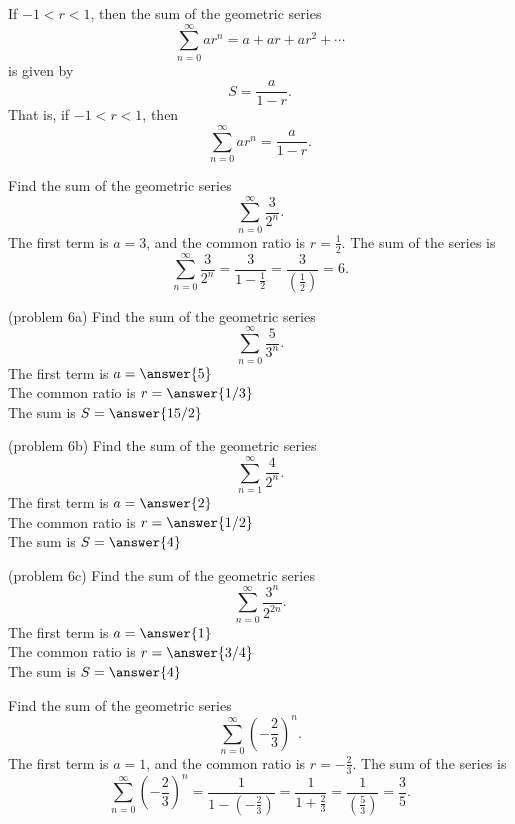 \documentclass{ximera}
\begin{document}
\begin{theorem}
If $-1 < r < 1$, then the sum of the geometric series 
\[
\sum_{n=0}^\infty ar^n = a + ar + ar^2 + \cdots
\] is given by 
\[
S = \frac{a}{1-r}.
\]
That is, if $-1 < r < 1$, then
\[
\sum_{n=0}^\infty ar^n = \frac{a}{1-r}.
\]
\end{theorem}

\begin{example}[example 6]
Find the sum of the geometric series 
\[
\sum_{n=0}^\infty \frac{3}{2^n}.
\]
The first term is $a = 3$, and the common ratio is $r = \frac12$. The sum of the series is
\[
\sum_{n=0}^\infty \frac{3}{2^n} = \frac{3}{1-\frac12} = \frac{3}{\left(\frac12\right)} = 6.
\]
\end{example}


\begin{problem}(problem 6a)
Find the sum of the geometric series 
\[
\sum_{n=0}^\infty \frac{5}{3^n}.
\]
The first term is $a = \answer{5}$\\
The common ratio is $r = \answer{1/3}$\\
The sum is $S= \answer{15/2}$

\end{problem}

\begin{problem}(problem 6b)
Find the sum of the geometric series 
\[
\sum_{n=1}^\infty \frac{4}{2^n}.
\]
The first term is $a = \answer{2}$\\
The common ratio is $r = \answer{1/2}$\\
The sum is $S= \answer{4}$

\end{problem}

\begin{problem}(problem 6c)
Find the sum of the geometric series 
\[
\sum_{n=0}^\infty \frac{3^n}{2^{2n}}.
\]
The first term is $a = \answer{1}$\\
The common ratio is $r = \answer{3/4}$\\
The sum is $S= \answer{4}$

\end{problem}



\begin{example}[example 7]
Find the sum of the geometric series 
\[
\sum_{n=0}^\infty \left(-\frac23\right)^n.
\]
The first term is $a = 1$, and the common ratio is $r = -\frac23$. The sum of the series is
\[
\sum_{n=0}^\infty \left(-\frac23\right)^n = \frac{1}{1-\left(-\frac23\right)} = \frac{1}{1 + \frac23} = \frac{1}{\left(\frac53\right)} = \frac35.
\]
\end{example}
\end{document}
